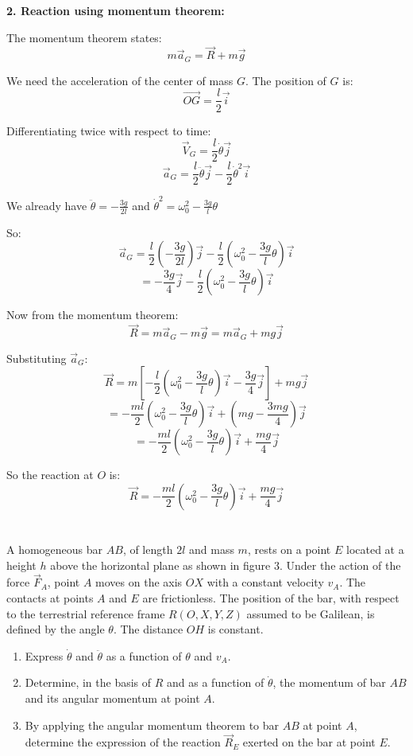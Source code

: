\documentclass[12pt]{article}
\begin{document}
\begin{correctionbox}
\textbf{2. Reaction using momentum theorem:}

The momentum theorem states:
$$m\vec{a}_G = \vec{R} + m\vec{g}$$

We need the acceleration of the center of mass $G$. The position of $G$ is:
$$\vec{OG} = \frac{l}{2}\vec{i}$$

Differentiating twice with respect to time:
$$\vec{V}_G = \frac{l}{2}\dot{\theta}\vec{j}$$
$$\vec{a}_G = \frac{l}{2}\ddot{\theta}\vec{j} - \frac{l}{2}\dot{\theta}^2\vec{i}$$

We already have $\ddot{\theta} = -\frac{3g}{2l}$ and $\dot{\theta}^2 = \omega_0^2 - \frac{3g}{l}\theta$

So:
$$\vec{a}_G = \frac{l}{2}\left(-\frac{3g}{2l}\right)\vec{j} - \frac{l}{2}\left(\omega_0^2 - \frac{3g}{l}\theta\right)\vec{i}$$
$$= -\frac{3g}{4}\vec{j} - \frac{l}{2}\left(\omega_0^2 - \frac{3g}{l}\theta\right)\vec{i}$$

Now from the momentum theorem:
$$\vec{R} = m\vec{a}_G - m\vec{g} = m\vec{a}_G + mg\vec{j}$$

Substituting $\vec{a}_G$:
$$\vec{R} = m\left[-\frac{l}{2}\left(\omega_0^2 - \frac{3g}{l}\theta\right)\vec{i} - \frac{3g}{4}\vec{j}\right] + mg\vec{j}$$
$$= -\frac{ml}{2}\left(\omega_0^2 - \frac{3g}{l}\theta\right)\vec{i} + \left(mg - \frac{3mg}{4}\right)\vec{j}$$
$$= -\frac{ml}{2}\left(\omega_0^2 - \frac{3g}{l}\theta\right)\vec{i} + \frac{mg}{4}\vec{j}$$

So the reaction at $O$ is:
$$\vec{R} = -\frac{ml}{2}\left(\omega_0^2 - \frac{3g}{l}\theta\right)\vec{i} + \frac{mg}{4}\vec{j}$$
\end{correctionbox}

\section{}

A homogeneous bar $AB$, of length $2l$ and mass $m$, rests on a point $E$ located at a height $h$ above the horizontal plane as shown in figure 3. Under the action of the force $\vec{F}_A$, point $A$ moves on the axis $OX$ with a constant velocity $v_A$. The contacts at points $A$ and $E$ are frictionless. The position of the bar, with respect to the terrestrial reference frame $R(O, X, Y, Z)$ assumed to be Galilean, is defined by the angle $\theta$. The distance $OH$ is constant.

\begin{enumerate}
    \item Express $\dot{\theta}$ and $\ddot{\theta}$ as a function of $\theta$ and $v_A$.
    \item Determine, in the basis of $R$ and as a function of $\dot{\theta}$, the momentum of bar $AB$ and its angular momentum at point $A$.
    \item By applying the angular momentum theorem to bar $AB$ at point $A$, determine the expression of the reaction $\vec{R}_E$ exerted on the bar at point $E$.
\end{enumerate}
\end{document}
